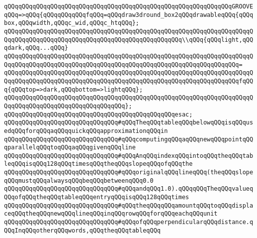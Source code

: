 \newline
\verb|qQQqqQQqqQQqqQQqqQQqqQQqqQQqqQQqqQQqqQQqqQQqqQQqqQQqqQQqqQQqqQQqGROOVEqQQq=>qQQq{qQQqqQQqqQQqfqQQq=qQQqdraw3dround_box2qQQqdrawableqQQq{qQQqbox,qQQqwidth,qQQqc_wid,qQQqc_htqQQq};|\newline
\newline
\verb|qQQqqQQqqQQqqQQqqQQqqQQqqQQqqQQqqQQqqQQqqQQqqQQqqQQqqQQqqQQqqQQqqQQqqQQqqQQqqQQqqQQqqQQqqQQqqQQqqQQqqQQqqQQqqQQqqQQqqQQq\\qQQq{qQQqlight,qQQqdark,qQQq...qQQq}|\newline
\verb|qQQqqQQqqQQqqQQqqQQqqQQqqQQqqQQqqQQqqQQqqQQqqQQqqQQqqQQqqQQqqQQqqQQqqQQqqQQqqQQqqQQqqQQqqQQqqQQqqQQqqQQqqQQqqQQqqQQqqQQqqQQqqQQqqQQqqQQq=|\newline
\verb|qQQqqQQqqQQqqQQqqQQqqQQqqQQqqQQqqQQqqQQqqQQqqQQqqQQqqQQqqQQqqQQqqQQqqQQqqQQqqQQqqQQqqQQqqQQqqQQqqQQqqQQqqQQqqQQqqQQqqQQqqQQqqQQqqQQqqQQqfqQQq{qQQqtop=>dark,qQQqbottom=>lightqQQq};|\newline
\verb|qQQqqQQqqQQqqQQqqQQqqQQqqQQqqQQqqQQqqQQqqQQqqQQqqQQqqQQqqQQqqQQqqQQqqQQqqQQqqQQqqQQqqQQqqQQqqQQqqQQqqQQq};|\newline
\verb|qQQqqQQqqQQqqQQqqQQqqQQqqQQqqQQqqQQqqQQqqQQqqQQqesac;|\newline
\newline
\newline
\newline
\newline
\verb|qQQqqQQqqQQqqQQqqQQqqQQqqQQqqQQq#qQQqTheqQQqtableqQQqbelowqQQqisqQQqusedqQQqforqQQqaqQQqquickqQQqapproximationqQQqin|\newline
\verb|qQQqqQQqqQQqqQQqqQQqqQQqqQQqqQQq#qQQqcomputingqQQqaqQQqnewqQQqpointqQQqparallelqQQqtoqQQqaqQQqgivenqQQqline|\newline
\verb|qQQqqQQqqQQqqQQqqQQqqQQqqQQqqQQq#qQQqAnqQQqindexqQQqintoqQQqtheqQQqtableqQQqisqQQq128qQQqtimesqQQqtheqQQqslopeqQQqofqQQqthe|\newline
\verb|qQQqqQQqqQQqqQQqqQQqqQQqqQQqqQQq#qQQqoriginalqQQqlineqQQq(theqQQqslopeqQQqmustqQQqalwaysqQQqbeqQQqbetweenqQQq0.0|\newline
\verb|qQQqqQQqqQQqqQQqqQQqqQQqqQQqqQQq#qQQqandqQQq1.0).qQQqqQQqTheqQQqvalueqQQqofqQQqtheqQQqtableqQQqentryqQQqisqQQq128qQQqtimes|\newline
\verb|qQQqqQQqqQQqqQQqqQQqqQQqqQQqqQQq#qQQqtheqQQqqQQqamountqQQqtoqQQqdisplaceqQQqtheqQQqnewqQQqlineqQQqinqQQqrowqQQqforqQQqeachqQQqunit|\newline
\verb|qQQqqQQqqQQqqQQqqQQqqQQqqQQqqQQq#qQQqofqQQqperpendicularqQQqdistance.qQQqInqQQqotherqQQqwords,qQQqtheqQQqtableqQQq|\newline
